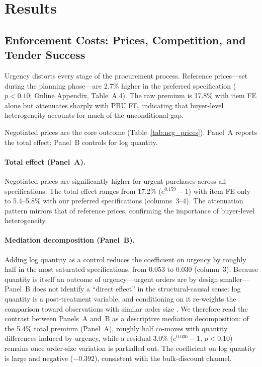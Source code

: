 \section{Results}
\label{sec:results}

\subsection{Enforcement Costs: Prices, Competition, and Tender Success}
\label{sec:main_results}

Urgency distorts every stage of the procurement process. Reference prices---set during the planning phase---are 2.7\% higher in the preferred specification ($p < 0.10$; Online Appendix, Table~A.4). The raw premium is 17.8\% with item FE alone but attenuates sharply with PBU FE, indicating that buyer-level heterogeneity accounts for much of the unconditional gap.

Negotiated prices are the core outcome (Table~\ref{tab:neg_prices}). Panel~A reports the total effect; Panel~B controls for log quantity.



\paragraph{Total effect (Panel~A).}
Negotiated prices are significantly higher for urgent purchases across all specifications. The total effect ranges from 17.2\% ($e^{0.159}-1$) with item FE only to 5.4--5.8\% with our preferred specifications (columns~3--4). The attenuation pattern mirrors that of reference prices, confirming the importance of buyer-level heterogeneity.

\paragraph{Mediation decomposition (Panel~B).}
Adding log quantity as a control reduces the coefficient on urgency by roughly half in the most saturated specifications, from 0.053 to 0.030 (column~3).\label{fn:mediation-anchor} Because quantity is itself an outcome of urgency---urgent orders are by design smaller---Panel~B does not identify a ``direct effect'' in the structural-causal sense: log quantity is a post-treatment variable, and conditioning on it re-weights the comparison toward observations with similar order size \citep{acharya2016explaining}. We therefore read the contrast between Panels~A and~B as a descriptive mediation decomposition: of the 5.4\% total premium (Panel~A), roughly half co-moves with quantity differences induced by urgency, while a residual 3.0\% ($e^{0.030}-1$, $p < 0.10$) remains once order-size variation is partialled out. The coefficient on log quantity is large and negative ($-0.392$), consistent with the bulk-discount channel.

